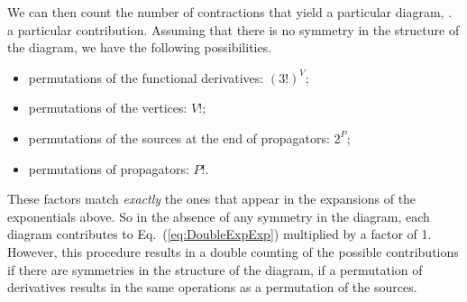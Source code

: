 We can then count the number of contractions that yield a particular
diagram, \ie. a particular contribution. Assuming that there is no
symmetry in the structure of the diagram, we have the following
possibilities. 
\begin{itemize}
\item permutations of the functional derivatives: $(3!)^V$;
\item permutations of the vertices: $V!$;
\item permutations of the sources at the end of propagators: $2^P$;
\item permutations of propagators: $P!$.
\end{itemize}
These factors match {\em exactly} the ones that appear in the
expansions of the exponentials above. So in the absence of any
symmetry in the diagram, each diagram contributes to
Eq.~(\ref{eq:DoubleExpExp}) multiplied by a factor of 1. However, this
procedure results in a double counting of the possible contributions
if there are symmetries in the structure of the diagram, \ie if a
permutation of derivatives results in the same operations as a
permutation of the sources. 

\bigskip

